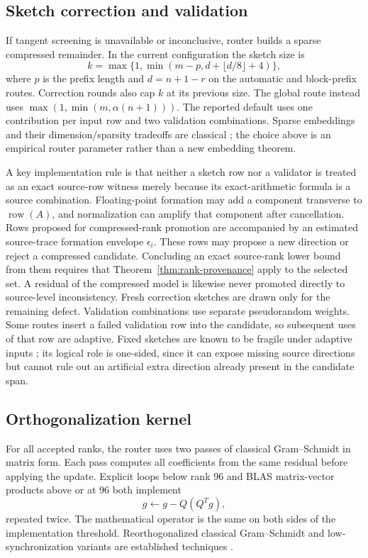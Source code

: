 \documentclass[11pt]{article}
\theoremstyle{definition}
\begin{document}
\subsection{Sketch correction and validation}
If tangent screening is unavailable or inconclusive, router builds a sparse compressed remainder. In the current configuration the sketch size is
\[
k=\max\{1,\min(m-p,d+\lfloor d/8\rfloor+4)\},
\]
where $p$ is the prefix length and $d=n+1-r$ on the automatic and block-prefix routes. Correction rounds also cap $k$ at its previous size. The global route instead uses $\max(1,\min(m,\alpha(n+1)))$. The reported default uses one contribution per input row and two validation combinations. Sparse embeddings and their dimension/sparsity tradeoffs are classical \citep{ClarksonWoodruff2013,NelsonNguyen2013}; the choice above is an empirical router parameter rather than a new embedding theorem.

A key implementation rule is that neither a sketch row nor a validator is treated as an exact source-row witness merely because its exact-arithmetic formula is a source combination. Floating-point formation may add a component transverse to $\operatorname{row}(A)$, and normalization can amplify that component after cancellation. Rows proposed for compressed-rank promotion are accompanied by an estimated source-trace formation envelope $\epsilon_i$. These rows may propose a new direction or reject a compressed candidate. Concluding an exact source-rank lower bound from them requires that Theorem~\ref{thm:rank-provenance} apply to the selected set. A residual of the compressed model is likewise never promoted directly to source-level inconsistency. Fresh correction sketches are drawn only for the remaining defect. Validation combinations use separate pseudorandom weights. Some routes insert a failed validation row into the candidate, so subsequent uses of that row are adaptive. Fixed sketches are known to be fragile under adaptive inputs \citep{HardtWoodruff2013}; its logical role is one-sided, since it can expose missing source directions but cannot rule out an artificial extra direction already present in the candidate span.

\subsection{Orthogonalization kernel}
For all accepted ranks, the router uses two passes of classical Gram--Schmidt in matrix form. Each pass computes all coefficients from the same residual before applying the update. Explicit loops below rank 96 and BLAS matrix-vector products above or at 96 both implement
\[
g\leftarrow g-Q(Q^Tg),
\]
repeated twice. The mathematical operator is the same on both sides of the implementation threshold. Reorthogonalized classical Gram--Schmidt and low-synchronization variants are established techniques \citep{CarsonLundMaOktay2024,CarsonMa2024}.
\end{document}
